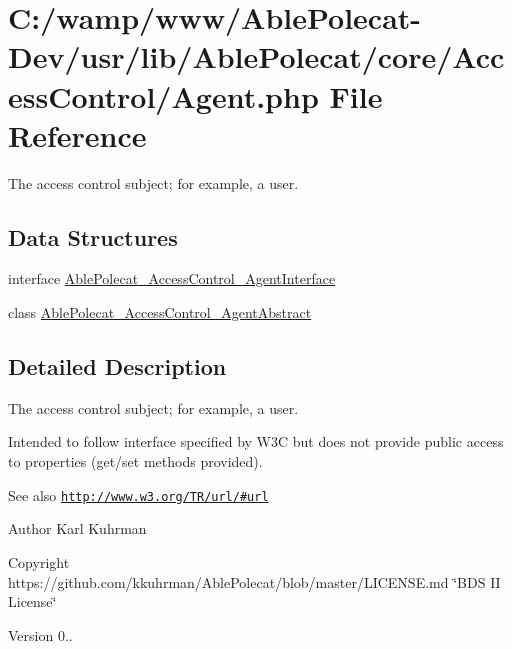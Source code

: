 \hypertarget{_agent_8php}{}\section{C\+:/wamp/www/\+Able\+Polecat-\/\+Dev/usr/lib/\+Able\+Polecat/core/\+Access\+Control/\+Agent.php File Reference}
\label{_agent_8php}


The access control \textquotesingle{}subject\textquotesingle{}; for example, a user.  


\subsection*{Data Structures}
\begin{DoxyCompactItemize}
\item 
interface \hyperlink{interface_able_polecat___access_control___agent_interface}{Able\+Polecat\+\_\+\+Access\+Control\+\_\+\+Agent\+Interface}
\item 
class \hyperlink{class_able_polecat___access_control___agent_abstract}{Able\+Polecat\+\_\+\+Access\+Control\+\_\+\+Agent\+Abstract}
\end{DoxyCompactItemize}


\subsection{Detailed Description}
The access control \textquotesingle{}subject\textquotesingle{}; for example, a user. 

Intended to follow interface specified by W3\+C but does not provide public access to properties (get/set methods provided).

\begin{DoxySeeAlso}{See also}
\href{http://www.w3.org/TR/url/#url}{\tt http\+://www.\+w3.\+org/\+T\+R/url/\#url}
\end{DoxySeeAlso}
\begin{DoxyAuthor}{Author}
Karl Kuhrman 
\end{DoxyAuthor}
\begin{DoxyCopyright}{Copyright}
https\+://github.com/kkuhrman/\+Able\+Polecat/blob/master/\+L\+I\+C\+E\+N\+S\+E.\+md \char`\"{}\+B\+D\+S I\+I License\char`\"{} 
\end{DoxyCopyright}
\begin{DoxyVersion}{Version}
0.. 
\end{DoxyVersion}
